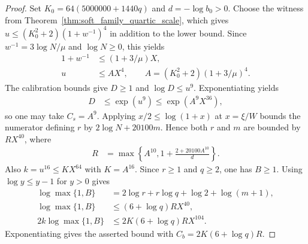 \begin{proof}\leanok
    Set $K_0=64(5000000+1440q)$ and $d=-\log b_0>0$.
    Choose the witness from Theorem~\ref{thm:soft_family_quartic_scale},
    which gives $u\le(K_0^2+2)(1+w^{-1})^4$ in addition to the lower bound.
    Since $w^{-1}=3\log N/\mu$ and $\log N\ge0$, this yields
    \begin{align}
        1+w^{-1} &\le (1+3/\mu)X, \label{eq:soft_growth_inverse_width}\\
        u &\le AX^4,\qquad A=(K_0^2+2)(1+3/\mu)^4.
            \label{eq:soft_growth_length_scale}
    \end{align}
    The calibration bounds give $D\ge1$ and $\log D\le u^9$.
    Exponentiating yields
    \begin{align}
        D &\le \exp(u^9)\le \exp(A^9X^{36}),
            \label{eq:soft_growth_size_bound}
    \end{align}
    so one may take $C_s=A^9$.
    Applying $x/2\le\log(1+x)$ at $x=\xi/W$ bounds the numerator
    defining $r$ by $2\log N+20100m$. Hence both $r$ and $m$ are
    bounded by $R X^{40}$, where
    \begin{align}
        R &= \max\left\{A^{10},1+\frac{2+20100A^{10}}{d}\right\}.
            \label{eq:soft_growth_order_constant}
    \end{align}
    Also
    $k=u^{16}\le KX^{64}$ with $K=A^{16}$. Since $r\ge1$ and $q\ge2$,
    one has $B\ge1$. Using $\log y\le y-1$ for $y>0$ gives
    \begin{align}
        \log\max\{1,B\} &= 2\log r+r\log q+\log 2+\log(m+1),
            \label{eq:soft_growth_log_factor}\\
        \log\max\{1,B\} &\le (6+\log q)R X^{40},
            \label{eq:soft_growth_log_bound}\\
        2k\log\max\{1,B\} &\le 2K(6+\log q)R X^{104}.
            \label{eq:soft_growth_log_dimension}
    \end{align}
    Exponentiating gives the asserted bound with $C_b=2K(6+\log q)R$.
\end{proof}
